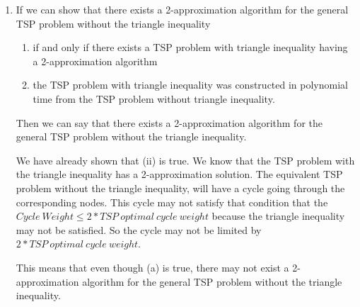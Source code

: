 \documentclass[paper=a4, fontsize=11pt]{scrartcl} %
\numberwithin{figure}{section} %
\numberwithin{table}{section} %
\begin{document}
\begin{enumerate}
\begin{enumerate}
\item If we can show that there exists a 2-approximation algorithm for the general TSP problem without the triangle inequality 
\begin{enumerate}
\item if and only if there exists a TSP problem with triangle inequality having a 2-approximation algorithm

\item the TSP problem with triangle inequality was constructed in polynomial time from the TSP problem without triangle inequality.
\end{enumerate}

Then we can say that there exists a 2-approximation algorithm for the general TSP problem without the triangle inequality.

We have already shown that (ii) is true. We know that the TSP problem with the triangle inequality has a 2-approximation solution. The equivalent TSP problem without the triangle inequality, will have a cycle going through the corresponding nodes. This cycle may not satisfy that condition that the $Cycle \: Weight \leq 2 * TSP \: optimal \: cycle \: weight$ because the triangle inequality may not be satisfied. So the cycle may not be limited by $2 * TSP \: optimal \: cycle \: weight$.

This means that even though (a) is true, there may not exist a 2-approximation algorithm for the general TSP problem without the triangle inequality.
\end{enumerate}




\end{enumerate}

\end{document}
